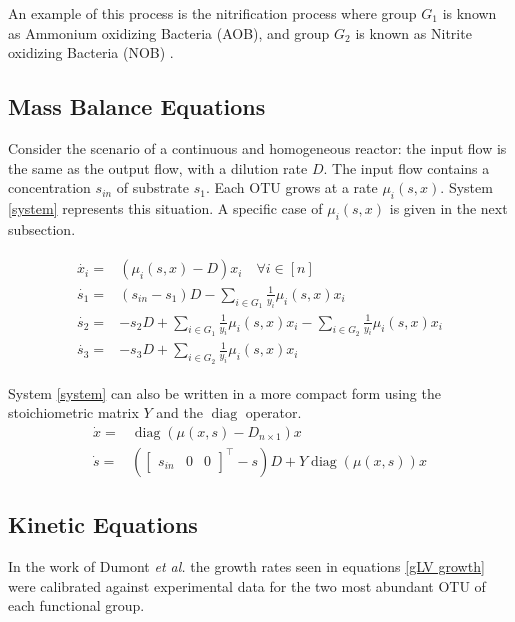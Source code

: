 \documentclass[processes,article,submit,moreauthors,pdftex]{Definitions/mdpi}
\DeclareMathOperator{\diag}{diag}
\begin{document}
An example of this process is the nitrification process where group $G_1$ is known as Ammonium oxidizing Bacteria (AOB), and group $G_2$ is known as Nitrite oxidizing Bacteria (NOB) \cite{SHARMA1977897}. 
\subsection{Mass Balance Equations}

Consider the scenario of a continuous and homogeneous reactor: the input flow is the same as the output flow, with a dilution rate $D$. The input flow contains a concentration $s_{in}$ of substrate $s_1$. Each OTU grows at a rate $\mu_i(s,x)$. System \eqref{system} represents this situation. A specific case of $\mu_i(s,x)$ is given in the next subsection. 

\begin{align} 
\label{system}
\begin{array}{cl}
\dot{x_i} =& \left(\mu_i(s,x) -D \right)x_i \quad \forall i \in [n] \\
\dot{s_1} =& \displaystyle (s_{in}-s_1)D - \sum\limits_{i\in G_1} \frac{1}{y_i} \mu_i(s,x) x_i  \\
\dot{s_2} = & \displaystyle -s_2D+\sum\limits_{i\in G_1} \frac{1}{y_i} \mu_i(s,x) x_i -\sum\limits_{i\in G_2} \frac{1}{y_i} \mu_i(s,x) x_i \\
\dot{s_3} =&  \displaystyle -s_3D+\sum\limits_{i\in G_2} \frac{1}{y_i} \mu_i(s,x) x_i  
\end{array}
\end{align}	

System \eqref{system} can also be written in a more compact form using the stoichiometric matrix $Y$ and the $\diag$ operator.
\begin{align}
\label{Eq1X}	\dot{x} = & \diag(\mu(x,s) - D_{n\times 1})x \\
\label{EqS}	\dot{s} = & \left(\begin{bmatrix} s_{in}&0&0 \end{bmatrix}^\top-s\right)D + Y\diag(\mu(x,s))x
\end{align} 

\subsection{Kinetic Equations}
In the work of Dumont \textit{et al.} \cite{Dumont2016} the growth rates seen in equations \eqref{gLV growth} were calibrated against experimental data for the two most abundant OTU of each functional group.
\end{document}
